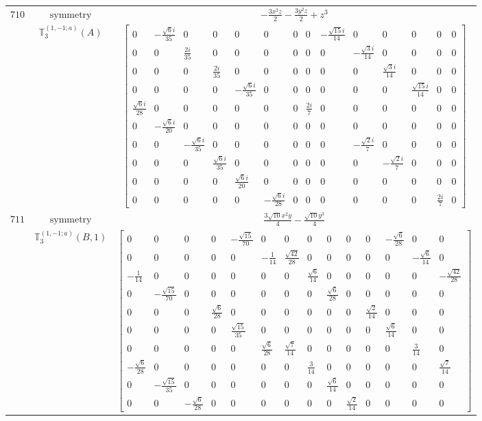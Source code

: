 \documentclass[fleqn,8pt,landscape]{jsarticle}
\begin{document}
\begin{longtable}{ccc}
$ 710 $ & $ \text{symmetry} $ & $ - \frac{3 x^{2} z}{2} - \frac{3 y^{2} z}{2} + z^{3} $ \\
$  $ & $ \mathbb{T}_{3}^{(1,-1;a)}(A) $ & $ \begin{bmatrix} 0 & - \frac{\sqrt{6} i}{35} & 0 & 0 & 0 & 0 & 0 & 0 & - \frac{\sqrt{15} i}{14} & 0 & 0 & 0 & 0 & 0 \\ 0 & 0 & \frac{2 i}{35} & 0 & 0 & 0 & 0 & 0 & 0 & - \frac{\sqrt{3} i}{14} & 0 & 0 & 0 & 0 \\ 0 & 0 & 0 & \frac{2 i}{35} & 0 & 0 & 0 & 0 & 0 & 0 & \frac{\sqrt{3} i}{14} & 0 & 0 & 0 \\ 0 & 0 & 0 & 0 & - \frac{\sqrt{6} i}{35} & 0 & 0 & 0 & 0 & 0 & 0 & \frac{\sqrt{15} i}{14} & 0 & 0 \\ \frac{\sqrt{6} i}{28} & 0 & 0 & 0 & 0 & 0 & 0 & \frac{2 i}{7} & 0 & 0 & 0 & 0 & 0 & 0 \\ 0 & - \frac{\sqrt{6} i}{20} & 0 & 0 & 0 & 0 & 0 & 0 & 0 & 0 & 0 & 0 & 0 & 0 \\ 0 & 0 & - \frac{\sqrt{6} i}{35} & 0 & 0 & 0 & 0 & 0 & 0 & - \frac{\sqrt{2} i}{7} & 0 & 0 & 0 & 0 \\ 0 & 0 & 0 & \frac{\sqrt{6} i}{35} & 0 & 0 & 0 & 0 & 0 & 0 & - \frac{\sqrt{2} i}{7} & 0 & 0 & 0 \\ 0 & 0 & 0 & 0 & \frac{\sqrt{6} i}{20} & 0 & 0 & 0 & 0 & 0 & 0 & 0 & 0 & 0 \\ 0 & 0 & 0 & 0 & 0 & - \frac{\sqrt{6} i}{28} & 0 & 0 & 0 & 0 & 0 & 0 & \frac{2 i}{7} & 0 \end{bmatrix} $ \\ \hline
$ 711 $ & $ \text{symmetry} $ & $ \frac{3 \sqrt{10} x^{2} y}{4} - \frac{\sqrt{10} y^{3}}{4} $ \\
$  $ & $ \mathbb{T}_{3}^{(1,-1;a)}(B,1) $ & $ \begin{bmatrix} 0 & 0 & 0 & 0 & - \frac{\sqrt{15}}{70} & 0 & 0 & 0 & 0 & 0 & 0 & - \frac{\sqrt{6}}{28} & 0 & 0 \\ 0 & 0 & 0 & 0 & 0 & - \frac{1}{14} & \frac{\sqrt{42}}{28} & 0 & 0 & 0 & 0 & 0 & - \frac{\sqrt{6}}{14} & 0 \\ - \frac{1}{14} & 0 & 0 & 0 & 0 & 0 & 0 & \frac{\sqrt{6}}{14} & 0 & 0 & 0 & 0 & 0 & - \frac{\sqrt{42}}{28} \\ 0 & - \frac{\sqrt{15}}{70} & 0 & 0 & 0 & 0 & 0 & 0 & \frac{\sqrt{6}}{28} & 0 & 0 & 0 & 0 & 0 \\ 0 & 0 & 0 & \frac{\sqrt{6}}{28} & 0 & 0 & 0 & 0 & 0 & 0 & \frac{\sqrt{2}}{14} & 0 & 0 & 0 \\ 0 & 0 & 0 & 0 & \frac{\sqrt{15}}{35} & 0 & 0 & 0 & 0 & 0 & 0 & \frac{\sqrt{6}}{14} & 0 & 0 \\ 0 & 0 & 0 & 0 & 0 & \frac{\sqrt{6}}{28} & \frac{\sqrt{7}}{14} & 0 & 0 & 0 & 0 & 0 & \frac{3}{14} & 0 \\ - \frac{\sqrt{6}}{28} & 0 & 0 & 0 & 0 & 0 & 0 & \frac{3}{14} & 0 & 0 & 0 & 0 & 0 & \frac{\sqrt{7}}{14} \\ 0 & - \frac{\sqrt{15}}{35} & 0 & 0 & 0 & 0 & 0 & 0 & \frac{\sqrt{6}}{14} & 0 & 0 & 0 & 0 & 0 \\ 0 & 0 & - \frac{\sqrt{6}}{28} & 0 & 0 & 0 & 0 & 0 & 0 & \frac{\sqrt{2}}{14} & 0 & 0 & 0 & 0 \end{bmatrix} $ \\ \hline

\end{longtable}
\end{document}
